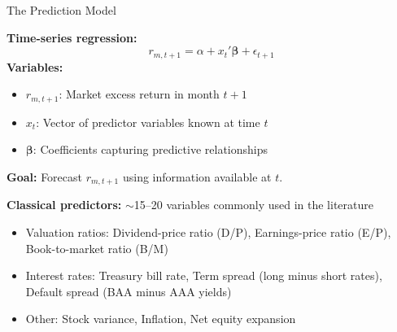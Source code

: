 \documentclass[10pt]{beamer}
\begin{document}
\begin{frame}{The Prediction Model}

\textbf{Time-series regression:}
\[
r_{m,t+1} = \alpha + x_t'\boldsymbol{\beta} + \epsilon_{t+1}
\]
\textbf{Variables:}
\begin{itemize}
  \item $r_{m,t+1}$: Market excess return in month $t+1$
  \item $x_t$: Vector of predictor variables known at time $t$
  \item $\boldsymbol{\beta}$: Coefficients capturing predictive relationships
\end{itemize}

\vspace{1em}
\textbf{Goal:} Forecast $r_{m,t+1}$ using information available at $t$.

\vspace{1em}

\textbf{Classical predictors:} $\sim$15--20 variables commonly used in the literature
\begin{itemize}
  \item Valuation ratios: Dividend-price ratio (D/P), Earnings-price ratio (E/P), Book-to-market ratio (B/M)
  \item Interest rates: Treasury bill rate, Term spread (long minus short rates), Default spread (BAA minus AAA yields)
  \item Other: Stock variance, Inflation, Net equity expansion
\end{itemize}





\end{frame}
\end{document}
